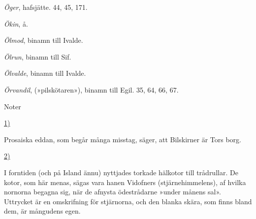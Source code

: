 \emph{Öger}, hafsjätte. 44, 45, 171.

\emph{Ökin}, å.

\emph{Ölmod}, binamn till Ivalde.

\emph{Ölrun}, binamn till Sif.

\emph{Ölvalde}, binamn till Ivalde.

\emph{Örvandil}, (»pilskötaren»), binamn till Egil. 35, 64, 66, 67.

\sectionbreak

\hypertarget{lb1625905.xhtmlux5cux23notes}{}
\protect\hypertarget{lb1625905.xhtmlux5cux23noter}{}{} Noter

\protect\hyperlink{lb1625905.xhtmlux5cux23ptrn1}{1)}

Prosaiska eddan, som begår många misstag, säger, att Bilskirner är Tors
borg.

\protect\hyperlink{lb1625905.xhtmlux5cux23ptrn2}{2)}

I forntiden (och på Island ännu) nyttjades torkade hälkotor till
trådrullar. De kotor, som här menas, sägas vara hanen Vidofners
(stjärnehimmelens), af hvilka nornorna begagna sig, när de afnysta
ödestrådarne »under månens sal». Uttrycket är en omskrifning för
stjärnorna, och den blanka skära, som finns bland dem, är mångudens
egen.

\bye
